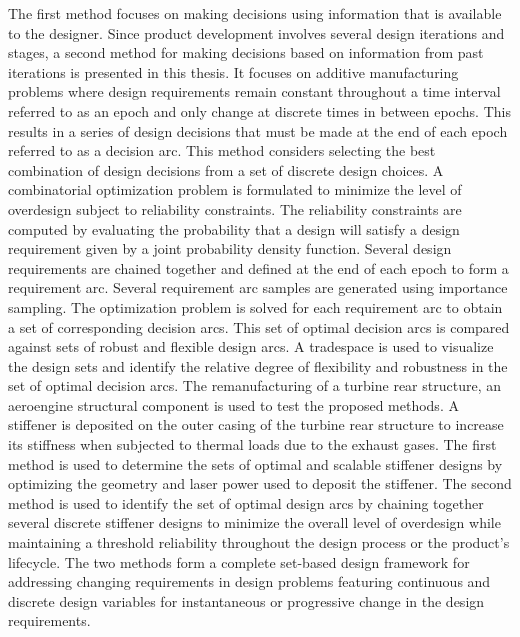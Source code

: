 \documentclass[12pt,Bold,letterpaper,TexShade,twoside]{mcgilletdclass}
\begin{document}
\begin{romanPagenumber}{2}
{The first method focuses on making decisions using information that is available to the designer. Since product development involves several design iterations and stages, a second method for making decisions based on information from past iterations is presented in this thesis. It focuses on additive manufacturing problems where design requirements remain constant throughout a time interval referred to as an epoch and only change at discrete times in between epochs. This results in a series of design decisions that must be made at the end of each epoch referred to as a decision arc. This method considers selecting the best combination of design decisions from a set of discrete design choices. A combinatorial optimization problem is formulated to minimize the level of overdesign subject to reliability constraints. The reliability constraints are computed by evaluating the probability that a design will satisfy a design requirement given by a joint probability density function. Several design requirements are chained together and defined at the end of each epoch to form a requirement arc. Several requirement arc samples are generated using importance sampling. The optimization problem is solved for each requirement arc to obtain a set of corresponding decision arcs. This set of optimal decision arcs is compared against sets of robust and flexible design arcs. A tradespace is used to visualize the design sets and identify the relative degree of flexibility and robustness in the set of optimal decision arcs.
The remanufacturing of a turbine rear structure, an aeroengine structural component is used to test the proposed methods. A stiffener is deposited on the outer casing of the turbine rear structure to increase its stiffness when subjected to thermal loads due to the exhaust gases. The first method is used to determine the sets of optimal and scalable stiffener designs by optimizing the geometry and laser power used to deposit the stiffener. The second method is used to identify the set of optimal design arcs by chaining together several discrete stiffener designs to minimize the overall level of overdesign while maintaining a threshold reliability throughout the design process or the product’s lifecycle.
The two methods form a complete set-based design framework for addressing changing requirements in design problems featuring continuous and discrete design variables for instantaneous or progressive change in the design requirements.}
\AbstractEn%


\end{romanPagenumber}
\end{document}
